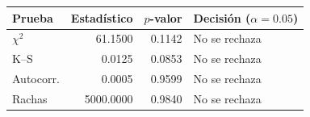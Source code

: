 \begin{tabular}{lrrl}
\toprule
Prueba & Estadístico & $p$-valor & Decisión ($\alpha=0.05$) \\
\midrule
$\chi^2$ & 61.1500 & 0.1142 & No se rechaza \\
K--S & 0.0125 & 0.0853 & No se rechaza \\
Autocorr. & 0.0005 & 0.9599 & No se rechaza \\
Rachas & 5000.0000 & 0.9840 & No se rechaza \\
\bottomrule
\end{tabular}
